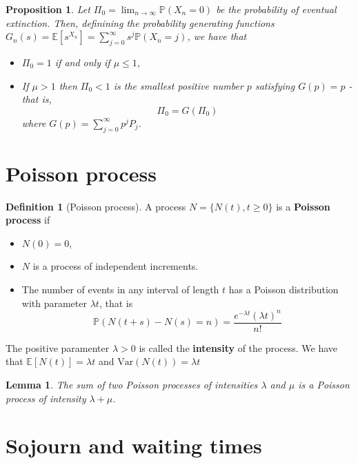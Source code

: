 \documentclass[10pt, oneside, reqno]{amsart}
\theoremstyle{plain}%
\newtheorem{lem}[thm]{Lemma}
\newtheorem{prop}[thm]{Proposition}
\theoremstyle{definition}
\newtheorem{defn}[thm]{Definition}
\theoremstyle{remark}
\newcommand{\expc}[1]{\mathbb{E}\left[#1\right]}
\newcommand{\var}[1]{\text{Var}\left(#1\right)}
\newcommand{\prob}[1]{\mathbb{P}(#1)}
\begin{document}
\begin{prop}
    Let $\Pi_0 = \lim_{n \rightarrow \infty} \prob{X_n = 0}$ be the probability of eventual extinction.  Then, definining the probability generating functions $G_n(s) = \expc{s^{X_n}} = \sum_{j=0}^\infty s^j \prob{X_n = j}$, we have that 
    \begin{itemize}
        \item $\Pi_0 = 1$ if and only if $\mu \leq 1$,
        \item If $\mu > 1$ then $\Pi_0 < 1$ is the smallest positive number $p$ satisfying $G(p) = p$ - that is, \[
            \Pi_0 = G(\Pi_0)
        \] where $G(p) = \sum_{j=0}^\infty p^j P_j$.
    \end{itemize}
\end{prop}



\section{Poisson process} %
\label{sub:poisson_process}
\begin{defn}[Poisson process]
    A process $N = \{N(t), t \geq 0\}$ is a \textbf{Poisson process} if 
    \begin{itemize}
        \item $N(0) = 0$,
        \item $N$ is a process of independent increments.
        \item The number of events in any interval of length $t$ has a Poisson distribution with parameter $\lambda t$, that is \[
            \prob{N(t+s) - N(s) = n}  = \frac{e^{-\lambda t} (\lambda t)^n}{n!}
        \]
    \end{itemize}
    
    The positive paramenter $\lambda > 0$ is called the \textbf{intensity} of the process.  We have that $\expc{N(t)} = \lambda t$ and $\var{N(t)} = \lambda t$
\end{defn}

\begin{lem}
    The sum of two Poisson processes of intensities $\lambda$ and $\mu$ is a Poisson process of intensity $\lambda + \mu$.
\end{lem}


\section{Sojourn and waiting times} %
\label{sub:sojourn_and_waiting_times}
\end{document}
